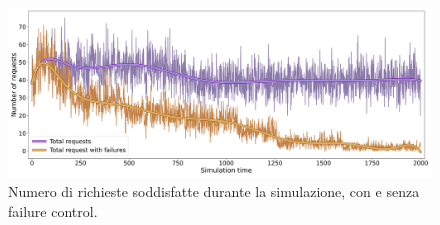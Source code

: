 \begin{figure}[!ht]
  \includegraphics[width=14cm]{images/min_conn_200_sim_1}
  \centering
  \caption{Numero di richieste soddisfatte durante la simulazione, con e senza failure control.}
  \label{fig:min_conn_200_sim_1}
\end{figure}